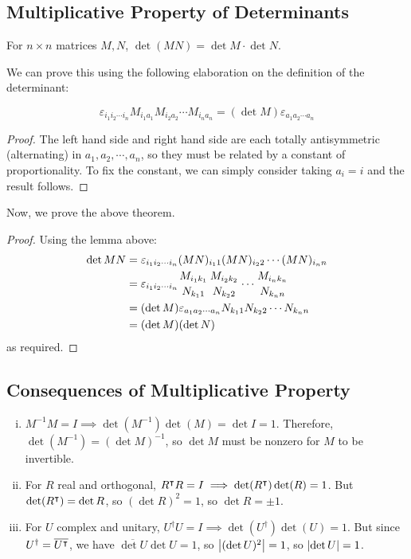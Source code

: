 \documentclass{article}
\begin{document}
\subsection{Multiplicative Property of Determinants}
\begin{theorem}
	For $n\times n$ matrices $M, N$, $\det (MN) = \det M \cdot \det N$.
\end{theorem}
\noindent We can prove this using the following elaboration on the definition of the determinant:
\begin{lemma}
	\[ \varepsilon_{i_1 i_2 \cdots i_n} M_{i_1 a_1} M_{i_2 a_2} \cdots M_{i_n a_n} = (\det M) \varepsilon_{a_1 a_2 \cdots a_n} \]
\end{lemma}
\begin{proof}
	The left hand side and right hand side are each totally antisymmetric (alternating) in $a_1, a_2, \cdots, a_n$, so they must be related by a constant of proportionality. To fix the constant, we can simply consider taking $a_i = i$ and the result follows.
\end{proof}
\noindent Now, we prove the above theorem.
\begin{proof}
	Using the lemma above:
	\begin{align*}
		\det MN & = \varepsilon_{i_1 i_2 \cdots i_n} (MN)_{i_1 1} (MN)_{i_2 2} \cdots (MN)_{i_n n}                                                    \\
		        & = \varepsilon_{i_1 i_2 \cdots i_n} {M_{i_1 k_1} \atop N_{k_1 1}} {M_{i_2 k_2} \atop N_{k_2 2}} \cdots {M_{i_n k_n} \atop N_{k_n n}} \\
		        & = (\det M) \varepsilon_{a_1 a_2 \cdots a_n} N_{k_1 1} N_{k_2 2} \cdots N_{k_n n}                                                    \\
		        & = (\det M)(\det N)
	\end{align*}
	as required.
\end{proof}

\subsection{Consequences of Multiplicative Property}
\begin{enumerate}[(i)]
	\item $M^{-1}M = I \implies \det(M^{-1}) \det(M) = \det I = 1$. Therefore, $\det (M^{-1}) = (\det M)^{-1}$, so $\det M$ must be nonzero for $M$ to be invertible.
	\item For $R$ real and orthogonal, $R^\intercal R = I \implies \det(R^\intercal) \det(R) = 1$. But $\det (R^\intercal) = \det R$, so $(\det R)^2 = 1$, so $\det R = \pm 1$.
	\item For $U$ complex and unitary, $U^\dagger U = I \implies \det(U^\dagger) \det(U) = 1$. But since $U^\dagger = \overline{U^\intercal}$, we have $\overline{\det U} \det U = 1$, so $\abs{(\det U)^2} = 1$, so $\abs{\det U} = 1$.
\end{enumerate}
\end{document}
